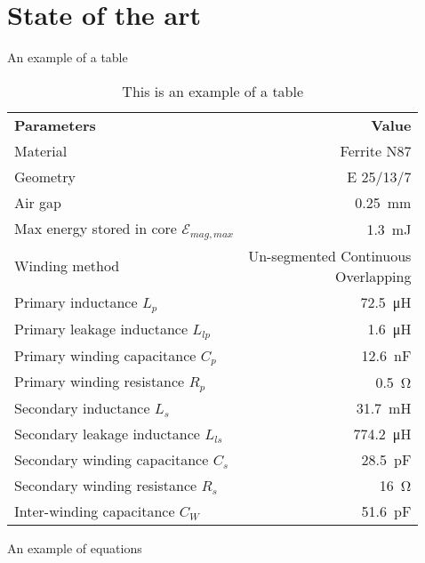 \documentclass[../main.tex]{subfiles}
\begin{document}
\chapter{State of the art}

An example of a table

\begin{table}[h]
    \begin{center}
        {\footnotesize
        \begin{tabular}{l r}
            \rowcolor{black} \textbf{\color{white} Parameters} & \textbf{\color{white} Value}\\
            Material & Ferrite N87 \\
            Geometry & E 25/13/7 \\
            Air gap & \SI{0.25}{\milli\meter} \\
            Max energy stored in core $\mathcal{E}_{mag,max}$ & \SI{1.3}{\milli\joule}\\
            Winding method & \makecell[tr]{Un-segmented Continuous \\ Overlapping}\\
            Primary inductance $L_p$ & \SI{72.5}{\micro\henry}\\
            Primary leakage inductance $L_{lp}$ & \SI{1.6}{\micro\henry}\\
            Primary winding capacitance $C_{p}$ & \SI{12.6}{\nano\farad}\\
            Primary winding resistance $R_p$ & \SI{0.5}{\ohm}\\
            Secondary inductance $L_s$ & \SI{31.7}{\milli\henry}\\
            Secondary leakage inductance $L_{ls}$ & \SI{774.2}{\micro\henry}\\
            Secondary winding capacitance $C_{s}$ & \SI{28.5}{\pico\farad}\\
            Secondary winding resistance $R_s$ & \SI{16}{\ohm}\\
            Inter-winding capacitance $C_W$ & \SI{51.6}{\pico\farad}
        \end{tabular}}
        \caption{This is an example of a table}
        \label{tab_components_7k}
    \end{center}
\end{table}

An example of equations
\end{document}
